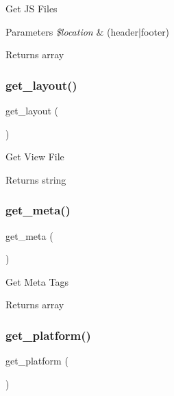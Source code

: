 Get JS Files 
\begin{DoxyParams}{Parameters}
{\em \$location} & (header$\vert$footer) \\
\hline
\end{DoxyParams}
\begin{DoxyReturn}{Returns}
array 
\end{DoxyReturn}
\mbox{\label{class_template_ab914fc6f8744c64a352cc6a0279e91c7}} 
\subsubsection{\texorpdfstring{get\+\_\+layout()}{get\_layout()}}
{\footnotesize\ttfamily get\+\_\+layout (\begin{DoxyParamCaption}{ }\end{DoxyParamCaption})}

Get View File \begin{DoxyReturn}{Returns}
string 
\end{DoxyReturn}
\mbox{\label{class_template_a83ddce330490a956720d8c3d6bf97372}} 
\subsubsection{\texorpdfstring{get\+\_\+meta()}{get\_meta()}}
{\footnotesize\ttfamily get\+\_\+meta (\begin{DoxyParamCaption}{ }\end{DoxyParamCaption})}

Get Meta Tags \begin{DoxyReturn}{Returns}
array 
\end{DoxyReturn}
\mbox{\label{class_template_af16eb38a172fb6712effb2dfffdac0ba}} 
\subsubsection{\texorpdfstring{get\+\_\+platform()}{get\_platform()}}
{\footnotesize\ttfamily get\+\_\+platform (\begin{DoxyParamCaption}{ }\end{DoxyParamCaption})}

